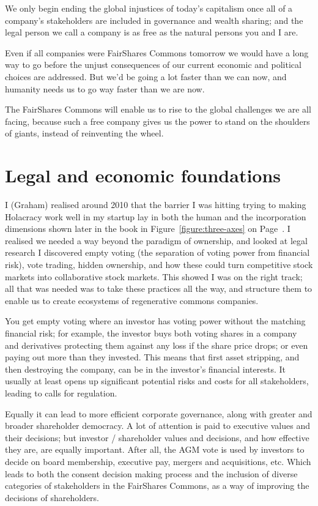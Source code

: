 We only begin ending the global injustices of today’s capitalism once all of a company’s stakeholders are included in governance and wealth sharing; and the legal person we call a company is as free as the natural persons you and I are. 


Even if all companies were FairShares Commons tomorrow we would have a long way to go before the unjust consequences of our current economic and political choices are addressed. But we’d be going a lot faster than we can now, and humanity needs us to go way faster than we are now.


The FairShares Commons will enable us to rise to the global challenges we are all facing, because such a free company gives us the power to stand on the shoulders of giants, instead of reinventing the wheel\cite{williams-free}. 
\section{Legal and economic foundations}
I (Graham) realised around 2010 that the barrier I was hitting trying to making Holacracy work well in my startup lay in both the human and the incorporation dimensions shown later in the book in Figure~\ref{figure:three-axes} on Page~\pageref{figure:three-axes}. I realised we needed a way beyond the paradigm of ownership, and looked at legal research I discovered empty voting (the separation of voting power from financial risk), vote trading, hidden ownership, and how these could turn competitive stock markets into collaborative stock markets. This showed I was on the right track; all that was needed was to take these practices all the way, and structure them to enable us to create ecosystems of regenerative commons companies.


You get empty voting where an investor has voting power without the matching financial risk; for example, the investor buys both voting shares in a company and derivatives protecting them against any loss if the share price drops; or even paying out more than they invested. This means that first asset stripping, and then destroying the company, can be in the investor’s financial interests. It usually at least opens up significant potential risks and costs for all stakeholders, leading to calls for regulation\cite{ringe-europe}.


Equally it can lead to more efficient corporate governance\cite{brav-empty-voting}, along with greater and broader shareholder democracy\cite{yermack-governance}. A lot of attention is paid to executive values and their decisions; but investor / shareholder values and decisions, and how effective they are, are equally important\cite{schouten-mechanisms}. After all, the AGM vote is used by investors to decide on board membership, executive pay, mergers and acquisitions, etc. Which leads to both the consent decision making process and the inclusion of diverse categories of stakeholders in the FairShares Commons, as a way of improving the decisions of shareholders.


